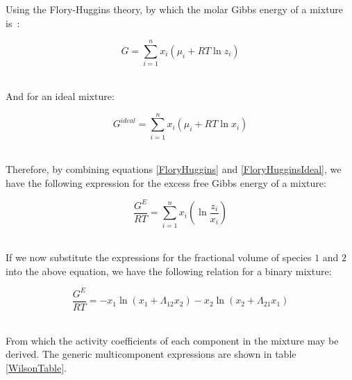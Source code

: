 Using the Flory-Huggins theory, by which the molar Gibbs energy of a mixture is~\cite{Walas}:\

\begin{equation}
G = \sum_{i=1}^{n} x_{i}\left(\mu_{i} + RT\ln z_{i}\right) \label{FloryHuggins}
\end{equation}\

And for an ideal mixture:\

\begin{equation}
G^{ideal} = \sum_{i=1}^{n} x_{i}\left(\mu_{i} + RT\ln x_{i}\right) \label{FloryHugginsIdeal}
\end{equation}\

Therefore, by combining equations \ref{FloryHuggins} and \ref{FloryHugginsIdeal}, we have the following expression for the excess free Gibbs energy of a mixture:\

\begin{equation}
\dfrac{G^{E}}{RT} = \sum_{i=1}^{n} x_{i}\left(\ln\dfrac{z_{i}}{x_{i}}\right)
\end{equation}\

If we now substitute the expressions for the fractional volume of species $1$ and $2$ into the above equation, we have the following relation for a binary mixture:\

\begin{equation}
\dfrac{G^{E}}{RT} = -x_{1}\ln\left(x_{1} + \Lambda_{12}x_{2}\right)-x_{2}\ln\left(x_{2} + \Lambda_{21}x_{1}\right)
\end{equation}\

From which the activity coefficients of each component in the mixture may be derived. The generic multicomponent expressions are shown in table \ref{WilsonTable}.\\

